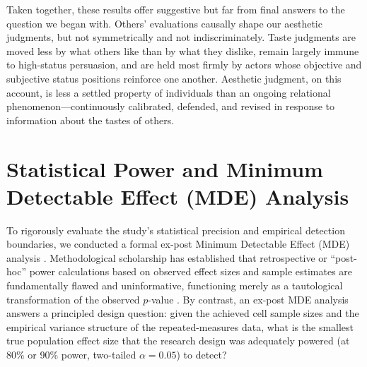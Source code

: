 \documentclass[12pt, letterpaper]{article}
\begin{document}
Taken together, these results offer suggestive but far from final answers to the question we began with.  Others' evaluations causally shape our aesthetic judgments, but not symmetrically and not indiscriminately. Taste judgments are moved less by what others like than by what they dislike, remain largely immune to high-status persuasion, and are held most firmly by actors whose objective and subjective status positions reinforce one another. Aesthetic judgment, on this account, is less a settled property of individuals than an ongoing relational phenomenon---continuously calibrated, defended, and revised in response to information about the tastes of others.





\newpage
\appendix
\renewcommand{\thetable}{A.\arabic{table}}
\setcounter{table}{0}
\renewcommand{\thefigure}{A.\arabic{figure}}
\setcounter{figure}{0}

\section{Statistical Power and Minimum Detectable Effect (MDE) Analysis}
\label{sec:appendix_power_mde}

To rigorously evaluate the study's statistical precision and empirical detection boundaries, we conducted a formal ex-post Minimum Detectable Effect (MDE) analysis \citep{bloom1995minimum}. Methodological scholarship has established that retrospective or ``post-hoc'' power calculations based on observed effect sizes and sample estimates are fundamentally flawed and uninformative, functioning merely as a tautological transformation of the observed $p$-value \citep{gelman2014beyond, hoenig2001abuse}. By contrast, an ex-post MDE analysis answers a principled design question: given the achieved cell sample sizes and the empirical variance structure of the repeated-measures data, what is the smallest true population effect size that the research design was adequately powered (at 80\% or 90\% power, two-tailed $\alpha = 0.05$) to detect?
\end{document}
